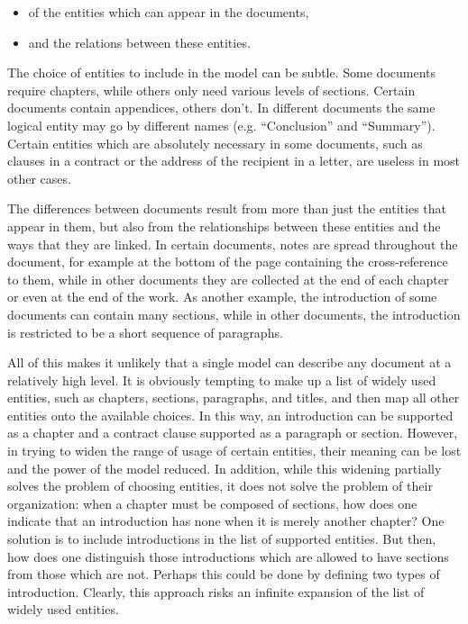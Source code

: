\begin{itemize}
\item
of the entities which can appear in the documents,
\item
and the relations between these entities.
\end{itemize}

The choice of entities to include in the model can be subtle.  Some
documents require chapters, while others only need various levels of
sections.  Certain documents contain appendices, others don't.  In
different documents the same logical entity may go by different names
(e.g. ``Conclusion'' and ``Summary'').  Certain entities which are
absolutely necessary in some documents, such as clauses in a contract
or the address of the recipient in a letter, are useless in most other
cases.

The differences between documents result from more than just the
entities that appear in them, but also from the relationships between
these entities and the ways that they are linked.  In certain
documents, notes are spread throughout the document, for example at
the bottom of the page containing the cross-reference to them, while
in other documents they are collected at the end of each chapter or
even at the end of the work.  As another example, the introduction of
some documents can contain many sections, while in other documents,
the introduction is restricted to be a short sequence of paragraphs.

All of this makes it unlikely that a single model can describe any
document at a relatively high level.  It is obviously tempting to make
up a list of widely used entities, such as chapters, sections,
paragraphs, and titles, and then map all other entities onto the
available choices.  In this way, an introduction can be supported as a
chapter and a contract clause supported as a paragraph or section.
However, in trying to widen the range of usage of certain entities,
their meaning can be lost and the power of the model reduced.  In
addition, while this widening partially solves the problem of choosing
entities, it does not solve the problem of their organization: when a
chapter must be composed of sections, how does one indicate that an
introduction has none when it is merely another chapter?  One solution
is to include introductions in the list of supported entities. But
then, how does one distinguish those introductions which are allowed
to have sections from those which are not.  Perhaps this could be done
by defining two types of introduction. Clearly, this approach risks an
infinite expansion of the list of widely used entities.


